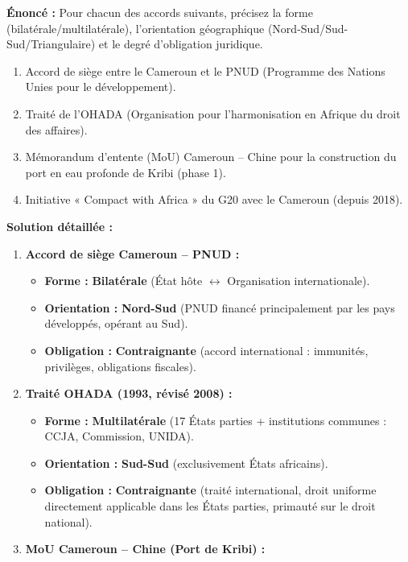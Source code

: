 \documentclass[11pt]{article}
\begin{document}
\begin{exoresolu}
\textbf{Énoncé :} Pour chacun des accords suivants, précisez la forme (bilatérale/multilatérale), l'orientation géographique (Nord-Sud/Sud-Sud/Triangulaire) et le degré d'obligation juridique.
\begin{enumerate}
    \item Accord de siège entre le Cameroun et le PNUD (Programme des Nations Unies pour le développement).
    \item Traité de l'OHADA (Organisation pour l'harmonisation en Afrique du droit des affaires).
    \item Mémorandum d'entente (MoU) Cameroun -- Chine pour la construction du port en eau profonde de Kribi (phase 1).
    \item Initiative « Compact with Africa » du G20 avec le Cameroun (depuis 2018).
\end{enumerate}
\tcblower
\textbf{Solution détaillée :}
\begin{enumerate}
    \item \textbf{Accord de siège Cameroun -- PNUD :}
    \begin{itemize}
        \item \textbf{Forme :} \textbf{Bilatérale} (État hôte $\leftrightarrow$ Organisation internationale).
        \item \textbf{Orientation :} \textbf{Nord-Sud} (PNUD financé principalement par les pays développés, opérant au Sud).
        \item \textbf{Obligation :} \textbf{Contraignante} (accord international : immunités, privilèges, obligations fiscales).
    \end{itemize}
    \item \textbf{Traité OHADA (1993, révisé 2008) :}
    \begin{itemize}
        \item \textbf{Forme :} \textbf{Multilatérale} (17 États parties + institutions communes : CCJA, Commission, UNIDA).
        \item \textbf{Orientation :} \textbf{Sud-Sud} (exclusivement États africains).
        \item \textbf{Obligation :} \textbf{Contraignante} (traité international, droit uniforme directement applicable dans les États parties, primauté sur le droit national).
    \end{itemize}
    \item \textbf{MoU Cameroun -- Chine (Port de Kribi) :}
    \begin{itemize}

\end{itemize}
\end{enumerate}
\end{exoresolu}
\end{document}
